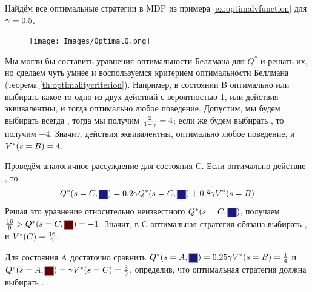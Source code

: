 \begin{example}
Найдём все оптимальные стратегии в MDP из примера \ref{ex:optimalvfunction} для $\gamma \HM= 0.5$.

\begin{figure}
\vspace{-0.2cm}
\centering
\texttt{[image: Images/OptimalQ.png]}
\vspace{-1cm}
\end{figure}

Мы могли бы составить уравнения оптимальности Беллмана для $Q^*$ и решать их, но сделаем чуть умнее и воспользуемся критерием оптимальности Беллмана (теорема \ref{th:optimalitycriterion}). Например, в состоянии B оптимально или выбирать какое-то одно из двух действий с вероятностью 1, или действия эквивалентны, и тогда оптимально любое поведение. Допустим, мы будем выбирать всегда , тогда мы получим $\frac{2}{1 - \gamma} \HM= 4$; если же будем выбирать , то получим +4. Значит, действия эквивалентны, оптимально любое поведение, и $V^*(s \HM= B) \HM= 4$.

Проведём аналогичное рассуждение для состояния C. Если оптимально действие , то $$Q^*(s \HM= C, \text{\colorsquare{ChadBlue}}) = 0.2 \gamma Q^*(s \HM= C, \text{\colorsquare{ChadBlue}}) + 0.8 \gamma V^*(s = B)$$
Решая это уравнение относительно неизвестного $Q^*(s \HM= C, \text{\colorsquare{ChadBlue}})$, получаем $\frac{16}{9} \HM> Q^*(s \HM= C, \text{\colorsquare{ChadRed}}) \HM= -1$. Значит, в C оптимальная стратегия обязана выбирать , и $V^*(C) \HM= \frac{16}{9}.$

Для состояния A достаточно сравнить $Q^*(s \HM= A, \text{\colorsquare{ChadBlue}}) \HM= 0.25 \gamma V^*(s \HM= B) \HM= \frac{1}{4}$ и $Q^*(s \HM= A, \text{\colorsquare{ChadRed}}) \HM= \gamma V^*(s \HM= C) \HM= \frac{8}{9}$, определив, что оптимальная стратегия должна выбирать .
\end{example}